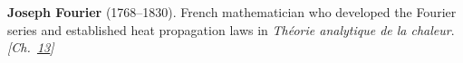 \textbf{Joseph Fourier} (1768–1830). French mathematician who developed the Fourier series and established heat propagation laws in \emph{Th\'{e}orie analytique de la chaleur}. \emph{[Ch.~\hyperref[ch:poissonsspot]{13}]}

